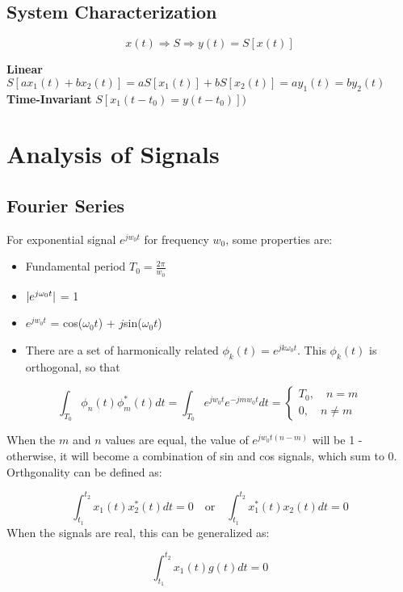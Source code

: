 \documentclass[11pt]{article}
\DeclarePairedDelimiter{\abs}{\lvert}{\rvert}
\begin{document}
\subsection{System Characterization}

$$x(t) \Rightarrow S \Rightarrow y(t) = S[x(t)] $$ 

\textbf{Linear} \quad $S[ax_1(t) + bx_2(t)] = aS[x_1(t)] + bS[x_2(t)] = ay_1(t) = by_2(t)$ \\
\textbf{Time-Invariant}  \quad $S[x_1(t-t_0) = y(t-t_0)])$

\section{Analysis of Signals}

\subsection{Fourier Series}
For exponential signal $e^{jw_0t}$ for frequency $w_0$, some properties are:

\begin{itemize}
    \item Fundamental period $T_0 = \frac{2\pi}{w_0}$
    \item $\abs{e^{j\omega_0t}}$ = 1
    \item $e^{jw_0t}$ = cos($\omega_0t$) + $j$sin($\omega_0t$)
    \item There are a set of harmonically related $\phi_k(t) = e^{jk\omega_0t}$. This $\phi_k(t)$ is orthogonal, so that
\end{itemize}

$$ \int_{T_0}\phi_n(t)\phi^*_m(t)dt = \int_{T_0}e^{jw_0t}e^{-jmw_0t}dt = \begin{cases}
    T_0,\quad n = m \\
    0, \quad n \neq m
\end{cases}$$

When the $m$ and $n$ values are equal, the value of $e^{jw_0t(n-m)}$ will be 1 - otherwise, it will become a combination of sin and cos signals, which sum to 0. \\ 

Orthgonality can be defined as:

$$\int^{t_2}_{t_1}x_1(t)x^*_2(t)dt = 0 \quad \text{or} \quad \int^{t_2}_{t_1}x^*_1(t)x_2(t)dt = 0$$
\hfill \break
When the signals are real, this can be generalized as:

$$\int^{t_2}_{t_1}x_1(t)g(t)dt = 0$$
\end{document}
